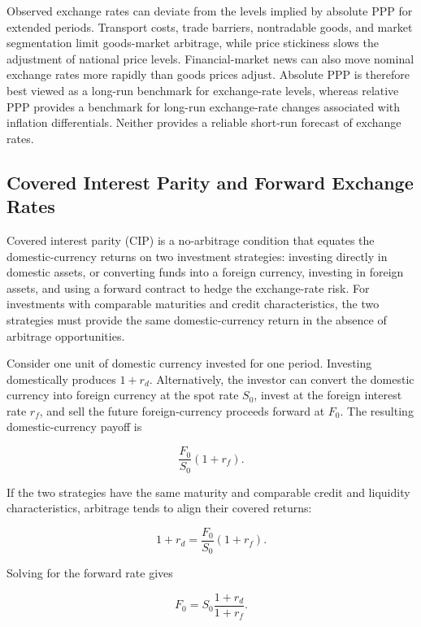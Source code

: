 Observed exchange rates can deviate from the levels
implied by absolute PPP for extended periods.
Transport costs, trade barriers, nontradable goods,
and market segmentation limit goods-market arbitrage,
while price stickiness slows the adjustment of national
price levels. Financial-market news can also move
nominal exchange rates more rapidly than goods prices
adjust. Absolute PPP is therefore best viewed as a
long-run benchmark for exchange-rate levels, whereas
relative PPP provides a benchmark for long-run
exchange-rate changes associated with inflation
differentials. Neither provides a reliable short-run
forecast of exchange rates.


\subsection{Covered Interest Parity and Forward Exchange Rates}

Covered interest parity (CIP) is a no-arbitrage
condition that equates the domestic-currency returns
on two investment strategies: investing directly
in domestic assets, or converting funds into a
foreign currency, investing in foreign assets, and
using a forward contract to hedge the exchange-rate
risk. For investments with comparable maturities
and credit characteristics, the two strategies
must provide the same domestic-currency return
in the absence of arbitrage opportunities.

Consider one unit of domestic currency invested for one period. Investing domestically produces $1+r_d$.  Alternatively, the investor can convert the domestic currency into foreign currency at the spot rate $S_0$, invest at the foreign interest rate $r_f$, and sell the future foreign-currency proceeds forward at $F_0$. The resulting domestic-currency payoff is

\begin{equation*}
\frac{F_0}{S_0}(1+r_f).
\label{eq:ch10-cip-foreign-payoff}
\end{equation*}

If the two strategies have the same maturity and comparable credit and liquidity characteristics, arbitrage tends to align their covered returns:

\begin{equation*}
1+r_d
=
\frac{F_0}{S_0}(1+r_f).
\label{eq:ch10-cip}
\end{equation*}

Solving for the forward rate gives

\begin{equation}
F_0
=S_0\frac{1+r_d}{1+r_f}.
\label{eq:ch10-forward-from-cip}
\end{equation}

